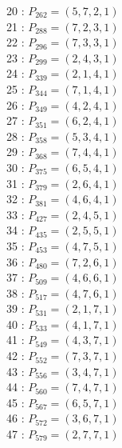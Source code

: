 \documentclass{article}
\begin{document}
{\begin{multicols}{2}
20 : $P_{262}=( 5, 7, 2, 1 )$\\
21 : $P_{288}=( 7, 2, 3, 1 )$\\
22 : $P_{296}=( 7, 3, 3, 1 )$\\
23 : $P_{299}=( 2, 4, 3, 1 )$\\
24 : $P_{339}=( 2, 1, 4, 1 )$\\
25 : $P_{344}=( 7, 1, 4, 1 )$\\
26 : $P_{349}=( 4, 2, 4, 1 )$\\
27 : $P_{351}=( 6, 2, 4, 1 )$\\
28 : $P_{358}=( 5, 3, 4, 1 )$\\
29 : $P_{368}=( 7, 4, 4, 1 )$\\
30 : $P_{375}=( 6, 5, 4, 1 )$\\
31 : $P_{379}=( 2, 6, 4, 1 )$\\
32 : $P_{381}=( 4, 6, 4, 1 )$\\
33 : $P_{427}=( 2, 4, 5, 1 )$\\
34 : $P_{435}=( 2, 5, 5, 1 )$\\
35 : $P_{453}=( 4, 7, 5, 1 )$\\
36 : $P_{480}=( 7, 2, 6, 1 )$\\
37 : $P_{509}=( 4, 6, 6, 1 )$\\
38 : $P_{517}=( 4, 7, 6, 1 )$\\
39 : $P_{531}=( 2, 1, 7, 1 )$\\
40 : $P_{533}=( 4, 1, 7, 1 )$\\
41 : $P_{549}=( 4, 3, 7, 1 )$\\
42 : $P_{552}=( 7, 3, 7, 1 )$\\
43 : $P_{556}=( 3, 4, 7, 1 )$\\
44 : $P_{560}=( 7, 4, 7, 1 )$\\
45 : $P_{567}=( 6, 5, 7, 1 )$\\
46 : $P_{572}=( 3, 6, 7, 1 )$\\
47 : $P_{579}=( 2, 7, 7, 1 )$\\
\end{multicols}
}
\end{document}
